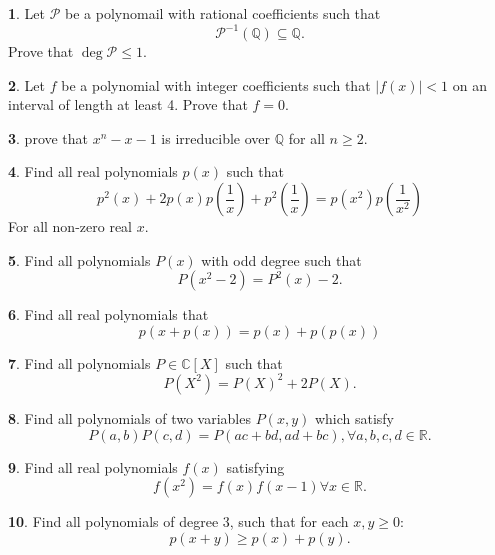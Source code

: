 \documentclass{article}
\theoremstyle{definition}
\newtheorem{p}{}
\begin{document}
\begin{p}
Let $\mathcal P$ be a polynomail with rational coefficients such that
\[\mathcal P^{-1}(\mathbb{Q}) \subseteq \mathbb{Q}.\]
Prove that $\deg\mathcal P \leq 1$.
\end{p}


\begin{p}
Let $f$ be a polynomial with integer coefficients such that $|f(x)|<1$ on an interval of length at least 4. Prove that  $f=0$.
\end{p}


\begin{p}
prove that $x^n-x-1$ is irreducible over $\mathbb{Q}$ for all $n \geq 2$.
\end{p}



\begin{p}
Find all real polynomials $p(x)$ such that 
\[p^{2}(x)+2p(x)p\left(\frac{1}{x}\right)+p^{2}\left(\frac{1}{x}\right) = p(x^{2})p\left(\frac{1}{x^{2}}\right)\]
For all non-zero real $x$.
\end{p}



\begin{p}
Find all polynomials $P(x)$ with odd degree such that 
\[P(x^{2}-2)=P^{2}(x)-2.\]
\end{p}



\begin{p}
Find all real polynomials that \[p(x+p(x))=p(x)+p(p(x))\]
\end{p}



\begin{p}
Find all polynomials $P\in \mathbb C[X]$ such that \[P(X^{2})=P(X)^{2}+2P(X).\]
\end{p}



\begin{p}
Find all polynomials of two variables $P(x,y)$ which satisfy
\[P(a,b) P(c,d) = P (ac+bd, ad+bc), \forall a,b,c,d \in \mathbb{R}.\]
\end{p}



\begin{p}
Find all real polynomials $f(x)$ satisfying
\[f(x^{2})=f(x)f(x-1) \forall x \in \mathbb R.\]
\end{p}



\begin{p}
Find all polynomials of degree $3$, such that for each $x,y\geq 0$: \[p(x+y)\geq p(x)+p(y).\]
\end{p}
\end{document}
